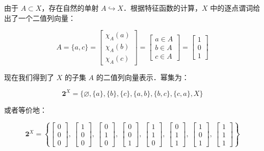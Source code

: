 \documentclass[10pt, openany]{book}
\begin{document}
由于 $A \subset X$，存在自然的单射 $A \hookrightarrow X$．根据特征函数的计算，$X$ 中的逐点谓词给出了一个二值列向量：

$$
A = \{a,c\}
= \begin{bmatrix}\chi_A(a)\\ \chi_A(b) \\ \chi_A(c)\end{bmatrix}
= \begin{bmatrix}a \in A\\ b \in A \\ c \in A\end{bmatrix}
= \begin{bmatrix}1\\ 0 \\ 1\end{bmatrix}
$$

现在我们得到了 $X$ 的子集 $A$ 的二值列向量表示．幂集为：

$$
\mathbf{2}^X = \{ \varnothing,\{a\},\{b\},\{c\},\{a,b\},\{b,c\},\{c,a\},X \}
$$

或者等价地：

$$
\mathbf{2}^X = \left\{ 
\begin{bmatrix}0\\0\\0\end{bmatrix},\ 
\begin{bmatrix}1\\0\\0\end{bmatrix},\ 
\begin{bmatrix}0\\1\\0\end{bmatrix},\ 
\begin{bmatrix}0\\0\\1\end{bmatrix},\ 
\begin{bmatrix}1\\1\\0\end{bmatrix},\ 
\begin{bmatrix}0\\1\\1\end{bmatrix},\ 
\begin{bmatrix}1\\0\\1\end{bmatrix},\ 
\begin{bmatrix}1\\1\\1\end{bmatrix} 
\right\}
$$
\end{document}
